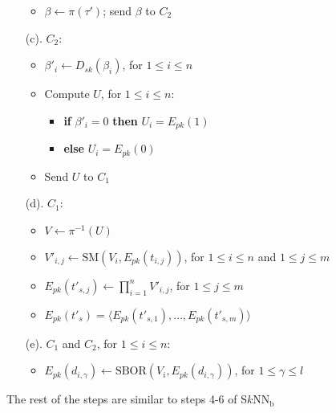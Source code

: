 \documentclass{article}
\newcommand{\sknnb}{S$k$NN$_\textrm{b}$}
\begin{document}
\begin{algorithm}[!htbp]
\begin{algorithmic}[1]
\begin{enumerate}
\begin{itemize}
                \item $\beta \gets \pi(\tau')$; send $\beta$ to $C_2$ 
              \end{itemize}  
    \item[(c).] $C_2$:
              \begin{itemize}\itemsep=-1pt
\item $\beta'_i \gets D_{sk}(\beta_i)$, for $1 \le i \le n$
                \item Compute $U$, for $1 \le i \le n$:
                     \begin{itemize}\itemsep=-1pt   
                             \item \textbf{if} $\beta'_i = 0$ \textbf{then} $U_i = E_{pk}(1)$ 
                             \item \textbf{else} $U_i = E_{pk}(0)$
                     \end{itemize}
                \item Send $U$ to $C_1$     
               \end{itemize}
    \item[(d).] $C_1$:
              \begin{itemize}\itemsep=-1pt
\item $V \gets \pi^{-1}(U)$
                 \item $V'_{i,j} \gets \textrm{SM}(V_i, E_{pk}(t_{i,j}))$, for $1 \le i \le n$ and $1 \le j \le m$  
                 \item $E_{pk}(t'_{s,j}) \gets  \prod_{i=1}^n V'_{i,j}$, for $1 \le j \le m$
                 \item  $E_{pk}(t'_s)= \langle E_{pk}(t'_{s,1}), \ldots, E_{pk}(t'_{s,m})\rangle$ 
              \end{itemize} 
    \item[(e).] $C_1$ and $C_2$, for $1 \le i \le n$:
              \begin{itemize}
                \item $E_{pk}(d_{i,\gamma}) \gets \textrm{SBOR}(V_i, E_{pk}(d_{i,\gamma}))$, for $1 \le \gamma \le l$
              \end{itemize}    
\end{enumerate}
\hspace{-0.45cm} The rest of the steps are similar to steps 4-6 of \sknnb
\begin{comment}
\STATE $C_1$:
\begin{enumerate}\itemsep=-1pt
     \item[(b).] Compute $ \gamma_1 \gets E_{pk}(t'_1) \ast E_{pk}(r),\dots, \gamma_k \gets E_{pk}(t'_k)\ast E_{pk}(r)$ where $r \in_R \mathbb{Z}_N$
     \item[(c).] Send $\langle  \gamma_1,\dots, \gamma_k \rangle$  to $C_2$ and $r$ to Bob
 \end{enumerate}


\end{comment}
\end{algorithmic}
\end{algorithm}
\end{document}
